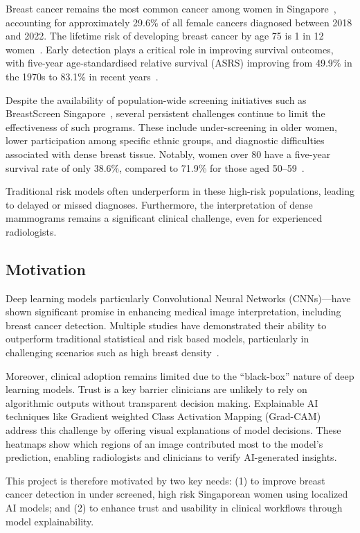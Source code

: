 \documentclass[12pt]{article}
\begin{document}
Breast cancer remains the most common cancer among women in Singapore~\cite{10}, accounting for approximately 29.6\% of all female cancers diagnosed between 2018 and 2022. The lifetime risk of developing breast cancer by age 75 is 1 in 12 women~\cite{10}. Early detection plays a critical role in improving survival outcomes, with five-year age-standardised relative survival (ASRS) improving from 49.9\% in the 1970s to 83.1\% in recent years~\cite{10}.

Despite the availability of population-wide screening initiatives such as BreastScreen Singapore~\cite{6}, several persistent challenges continue to limit the effectiveness of such programs. These include under-screening in older women, lower participation among specific ethnic groups, and diagnostic difficulties associated with dense breast tissue. Notably, women over 80 have a five-year survival rate of only 38.6\%, compared to 71.9\% for those aged 50--59~\cite{10}. 

Traditional risk models often underperform in these high-risk populations, leading to delayed or missed diagnoses. Furthermore, the interpretation of dense mammograms remains a significant clinical challenge, even for experienced radiologists. 

\subsection{Motivation}
Deep learning models particularly Convolutional Neural Networks (CNNs)—have shown significant promise in enhancing medical image interpretation, including breast cancer detection. Multiple studies have demonstrated their ability to outperform traditional statistical and risk based models, particularly in challenging scenarios such as high breast density~\cite{1,7,13}. 

Moreover, clinical adoption remains limited due to the ``black-box'' nature of deep learning models. Trust is a key barrier clinicians are unlikely to rely on algorithmic outputs without transparent decision making. Explainable AI techniques like Gradient weighted Class Activation Mapping (Grad-CAM)~\cite{5} address this challenge by offering visual explanations of model decisions. These heatmaps show which regions of an image contributed most to the model's prediction, enabling radiologists and clinicians to verify AI-generated insights.

This project is therefore motivated by two key needs: (1) to improve breast cancer detection in under screened, high risk Singaporean women using localized AI models; and (2) to enhance trust and usability in clinical workflows through model explainability.
\end{document}
